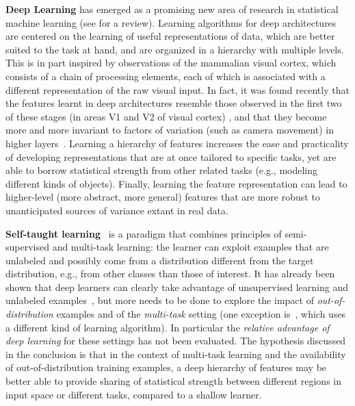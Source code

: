 \documentclass[smallcondensed]{svjour3}     %
\begin{document}
{\bf Deep Learning} has emerged as a promising new area of research in
statistical machine learning (see \citet{Bengio-2009} for a review).
Learning algorithms for deep architectures are centered on the learning
of useful representations of data, which are better suited to the task at hand,
and are organized in a hierarchy with multiple levels.
This is in part inspired by observations of the mammalian visual cortex, 
which consists of a chain of processing elements, each of which is associated with a
different representation of the raw visual input. In fact,
it was found recently that the features learnt in deep architectures resemble
those observed in the first two of these stages (in areas V1 and V2
of visual cortex) \citep{HonglakL2008}, and that they become more and
more invariant to factors of variation (such as camera movement) in
higher layers~\citep{Goodfellow2009}.
Learning a hierarchy of features increases the
ease and practicality of developing representations that are at once
tailored to specific tasks, yet are able to borrow statistical strength
from other related tasks (e.g., modeling different kinds of objects). Finally, learning the
feature representation can lead to higher-level (more abstract, more
general) features that are more robust to unanticipated sources of
variance extant in real data.

{\bf Self-taught learning}~\citep{RainaR2007} is a paradigm that combines principles
of semi-supervised and multi-task learning: the learner can exploit examples
that are unlabeled and possibly come from a distribution different from the target
distribution, e.g., from other classes than those of interest. 
It has already been shown that deep learners can clearly take advantage of
unsupervised learning and unlabeled examples~\citep{Bengio-2009,WestonJ2008-small},
but more needs to be done to explore the impact
of {\em out-of-distribution} examples and of the {\em multi-task} setting
(one exception is~\citep{CollobertR2008}, which uses a different kind
of learning algorithm). In particular the {\em relative
advantage of deep learning} for these settings has not been evaluated.
The hypothesis discussed in the conclusion is that in the context of 
multi-task learning and the availability of out-of-distribution training examples, 
a deep hierarchy of features
may be better able to provide sharing of statistical strength
between different regions in input space or different tasks, compared to
a shallow learner.
\end{document}
